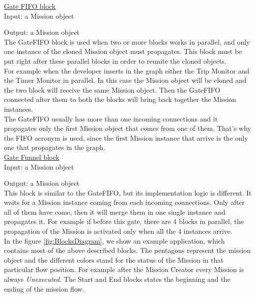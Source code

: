 \underline{Gate FIFO block}
\\

Input: a Mission object

Output: a Mission object
\\

The GateFIFO block is used when two or more blocks works in parallel, and only one instance of the cloned Mission object must propagates.
This block must be put right after these parallel blocks in order to reunite the cloned objects.
\\
For example when the developer inserts in the graph either the Trip Monitor and the Timer Monitor in parallel. In this case the Mission object will be cloned and the two block will receive the same Mission object. Then the GateFIFO connected after them to both the blocks will bring back together the Mission instances.
\\
The GateFIFO usually has more than one incoming connections and it propagates only the first Mission object that comes from one of them.
That's why the FIFO acronym is used, since the first Mission instance that arrive is the only one that propagates in the graph.
\\

\underline{Gate Funnel block}
\\

Input: a Mission object

Output: a Mission object
\\

This block is similar to the GateFIFO, but its implementation logic is different.
It waits for a Mission instance coming from each incoming connections. Only after all of them have come, then it will merge them in one single instance and propagates it.
For example if before this gate, there are 4 blocks in parallel, the propagation of the Mission is activated only when all the 4 instances arrive.
\\

In the figure \ref{fig:BlocksDiagram}, we show an example application, which contains most of the above described blocks. The pentagons represent the mission object and the different colors stand for the status of the Mission in that particular flow position. For example after the Mission Creator every Mission is always \textit{Unexecuted}.
The Start and End blocks states the beginning and the ending of the mission flow.
\\

